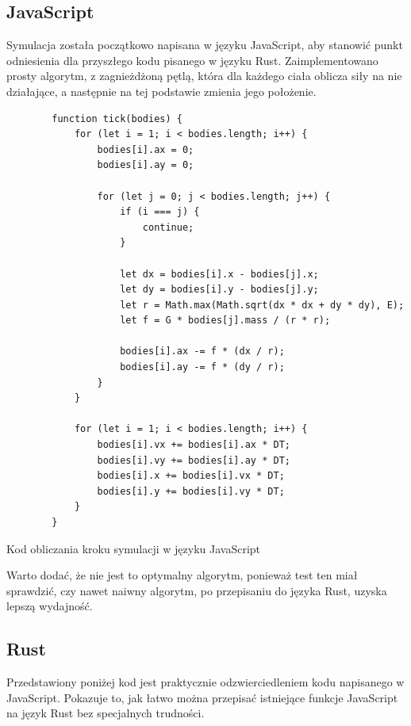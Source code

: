 \documentclass[language=polish,type=master]{aghmodern}
\begin{document}
\clearpage

\subsection{JavaScript}
Symulacja została początkowo napisana w języku JavaScript, aby stanowić punkt odniesienia dla przyszłego kodu pisanego w języku Rust.
Zaimplementowano prosty algorytm, z zagnieżdżoną pętlą, która dla każdego ciała oblicza siły na nie działające, a następnie na tej podstawie zmienia jego położenie.

\begin{listing}[H]
    \begin{verbatim}
        function tick(bodies) {
            for (let i = 1; i < bodies.length; i++) {
                bodies[i].ax = 0;
                bodies[i].ay = 0;

                for (let j = 0; j < bodies.length; j++) {
                    if (i === j) {
                        continue;
                    }

                    let dx = bodies[i].x - bodies[j].x;
                    let dy = bodies[i].y - bodies[j].y;
                    let r = Math.max(Math.sqrt(dx * dx + dy * dy), E);
                    let f = G * bodies[j].mass / (r * r);

                    bodies[i].ax -= f * (dx / r);
                    bodies[i].ay -= f * (dy / r);
                }
            }

            for (let i = 1; i < bodies.length; i++) {
                bodies[i].vx += bodies[i].ax * DT;
                bodies[i].vy += bodies[i].ay * DT;
                bodies[i].x += bodies[i].vx * DT;
                bodies[i].y += bodies[i].vy * DT;
            }
        }
    \end{verbatim}
    \caption{Kod obliczania kroku symulacji w języku JavaScript}
\end{listing}

Warto dodać, że nie jest to optymalny algorytm, ponieważ test ten miał sprawdzić, czy nawet naiwny algorytm, po przepisaniu do języka Rust, uzyska lepszą wydajność.

\subsection{Rust}
Przedstawiony poniżej kod jest praktycznie odzwierciedleniem kodu napisanego w JavaScript.
Pokazuje to, jak łatwo można przepisać istniejące funkcje JavaScript na język Rust bez specjalnych trudności.
\end{document}
